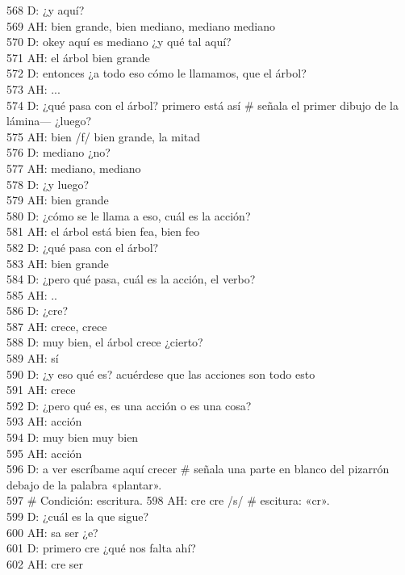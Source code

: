 568 D: ¿y aquí?\\
569 AH: bien grande, bien mediano, mediano mediano\\
570 D: okey aquí es mediano ¿y qué tal aquí?\\
571 AH: el árbol bien grande\\
572 D: entonces ¿a todo eso cómo le llamamos, que el árbol?\\
573 AH: ...\\
574 D: ¿qué pasa con el árbol? primero está así \# señala el primer dibujo de la lámina--- ¿luego?\\
575 AH: bien /f/ bien grande, la mitad\\
576 D: mediano ¿no?\\
577 AH: mediano, mediano\\
578 D: ¿y luego?\\
579 AH: bien grande\\
580 D: ¿cómo se le llama a eso, cuál es la acción?\\
581 AH: el árbol está bien fea, bien feo\\
582 D: ¿qué pasa con el árbol?\\
583 AH: bien grande\\
584 D: ¿pero qué pasa, cuál es la acción, el verbo?\\
585 AH: ..\\
586 D: ¿cre?\\
587 AH: crece, crece\\
588 D: muy bien, el árbol crece ¿cierto?\\
589 AH: sí\\
590 D: ¿y eso qué es? acuérdese que las acciones son todo esto\\
591 AH: crece\\
592 D: ¿pero qué es, es una acción o es una cosa?\\
593 AH: acción\\
594 D: muy bien muy bien\\
595 AH: acción\\
596 D: a ver escríbame aquí crecer \# señala una parte en blanco del pizarrón debajo de la palabra «plantar».\\
597 \# Condición: escritura.
598 AH: cre cre /s/ \# escitura: «cr».\\
599 D: ¿cuál es la que sigue?\\
600 AH: sa ser ¿e?\\
601 D: primero cre ¿qué nos falta ahí?\\
602 AH: cre ser\\
